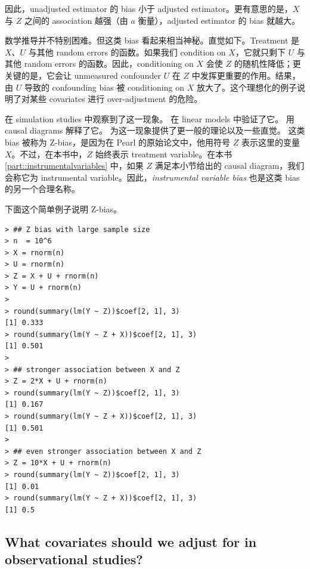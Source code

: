 因此，unadjusted estimator 的 bias 小于 adjusted estimator。更有意思的是，$X$ 与 $Z$ 之间的 association 越强（由 $a$ 衡量），adjusted estimator 的 bias 就越大。


数学推导并不特别困难。但这类 bias 看起来相当神秘。直觉如下。Treatment 是 $X$、$U$ 与其他 random errors 的函数。如果我们 condition on $X$，它就只剩下 $U$ 与其他 random errors 的函数。因此，conditioning on $X$ 会使 $Z$ 的随机性降低；更关键的是，它会让 unmeasured confounder $U$ 在 $Z$ 中发挥更重要的作用。结果，由 $U$ 导致的 confounding bias 被 conditioning on $X$ 放大了。这个理想化的例子说明了对某些 covariates 进行 over-adjustment 的危险。



 \citet{heckman2004using} 在 simulation studies 中观察到了这一现象。
 \citet[][technical report in 2006]{wooldridge2009should} 在 linear models 中验证了它。
 \citet{pearl2010class, pearl2011invited} 用 causal diagrams 解释了它。
 \citet{ding2017instrumental} 为这一现象提供了更一般的理论以及一些直觉。
 这类 bias 被称为 Z-bias，是因为在 Pearl 的原始论文中，他用符号 $Z$ 表示这里的变量 $X$。不过，在本书中，$Z$ 始终表示 treatment variable。在本书 \cref{part::instrumentalvariables} 中，如果 $Z$ 满足本小节给出的 causal diagram，我们会称它为 instrumental variable。因此，{\it instrumental variable bias} 也是这类 bias 的另一个合理名称。



下面这个简单例子说明 Z-bias。
\begin{lstlisting}
> ## Z bias with large sample size
> n  = 10^6
> X = rnorm(n)
> U = rnorm(n)
> Z = X + U + rnorm(n)
> Y = U + rnorm(n)
> 
> round(summary(lm(Y ~ Z))$coef[2, 1], 3)
[1] 0.333
> round(summary(lm(Y ~ Z + X))$coef[2, 1], 3)
[1] 0.501
> 
> ## stronger association between X and Z
> Z = 2*X + U + rnorm(n)
> round(summary(lm(Y ~ Z))$coef[2, 1], 3)
[1] 0.167
> round(summary(lm(Y ~ Z + X))$coef[2, 1], 3)
[1] 0.501
> 
> ## even stronger association between X and Z
> Z = 10*X + U + rnorm(n)
> round(summary(lm(Y ~ Z))$coef[2, 1], 3)
[1] 0.01
> round(summary(lm(Y ~ Z + X))$coef[2, 1], 3)
[1] 0.5
\end{lstlisting} 


\subsection{What covariates should we adjust for in observational studies?}


